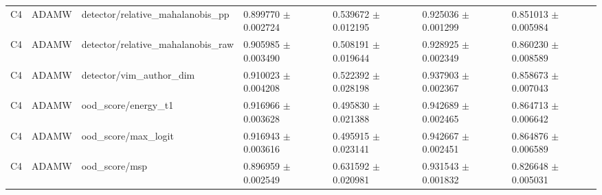 \begin{longtable}{lllllll}
C4 & ADAMW & detector/relative\_mahalanobis\_pp & 0.899770 $\pm$ 0.002724 & 0.539672 $\pm$ 0.012195 & 0.925036 $\pm$ 0.001299 & 0.851013 $\pm$ 0.005984 \\
C4 & ADAMW & detector/relative\_mahalanobis\_raw & 0.905985 $\pm$ 0.003490 & 0.508191 $\pm$ 0.019644 & 0.928925 $\pm$ 0.002349 & 0.860230 $\pm$ 0.008589 \\
C4 & ADAMW & detector/vim\_author\_dim & 0.910023 $\pm$ 0.004208 & 0.522392 $\pm$ 0.028198 & 0.937903 $\pm$ 0.002367 & 0.858673 $\pm$ 0.007043 \\
C4 & ADAMW & ood\_score/energy\_t1 & 0.916966 $\pm$ 0.003628 & 0.495830 $\pm$ 0.021388 & 0.942689 $\pm$ 0.002465 & 0.864713 $\pm$ 0.006642 \\
C4 & ADAMW & ood\_score/max\_logit & 0.916943 $\pm$ 0.003616 & 0.495915 $\pm$ 0.023141 & 0.942667 $\pm$ 0.002451 & 0.864876 $\pm$ 0.006589 \\
C4 & ADAMW & ood\_score/msp & 0.896959 $\pm$ 0.002549 & 0.631592 $\pm$ 0.020981 & 0.931543 $\pm$ 0.001832 & 0.826648 $\pm$ 0.005031 \\
\end{longtable}
